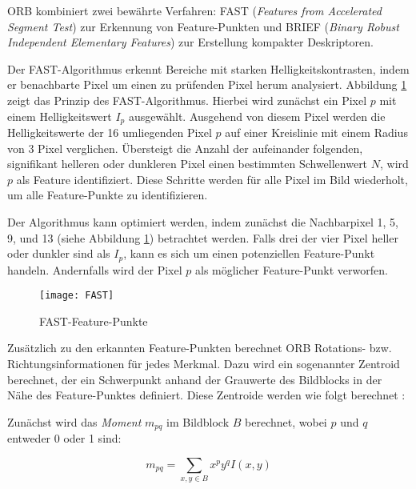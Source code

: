 ORB kombiniert zwei bewährte Verfahren: FAST (\emph{Features from Accelerated Segment Test}) zur Erkennung von Feature-Punkten und BRIEF (\emph{Binary Robust Independent Elementary Features}) zur Erstellung kompakter Deskriptoren. \cite{gao2021vSLAM, rublee2011orb}

Der FAST-Algorithmus erkennt Bereiche mit starken Helligkeitskontrasten, indem er benachbarte Pixel um einen zu prüfenden Pixel herum analysiert. Abbildung \ref{fig:FAST} zeigt das Prinzip des FAST-Algorithmus. Hierbei wird zunächst ein Pixel \( p \) mit einem Helligkeitswert \( I_p \) ausgewählt. Ausgehend von diesem Pixel werden die Helligkeitswerte der 16 umliegenden Pixel \( p \) auf einer Kreislinie mit einem Radius von 3 Pixel verglichen. Übersteigt die Anzahl der aufeinander folgenden, signifikant helleren oder dunkleren Pixel einen bestimmten Schwellenwert \( N \), wird \( p \) als Feature identifiziert. Diese Schritte werden für alle Pixel im Bild wiederholt, um alle Feature-Punkte zu identifizieren. \cite{gao2021vSLAM, rublee2011orb, rosten2006fast}

Der Algorithmus kann optimiert werden, indem zunächst die Nachbarpixel 1, 5, 9, und 13 (siehe Abbildung \ref{fig:FAST}) betrachtet werden. Falls drei der vier Pixel heller oder dunkler sind als \( I_p \), kann es sich um einen potenziellen Feature-Punkt handeln. Andernfalls wird der Pixel \( p \) als möglicher Feature-Punkt verworfen. \cite{gao2021vSLAM, rublee2011orb, rosten2006fast}

\begin{figure}[ht]
    \centering
    \texttt{[image: FAST]}
    \caption{FAST-Feature-Punkte \cite{rosten2006fast}\label{fig:FAST}}\par
\end{figure}

Zusätzlich zu den erkannten Feature-Punkten berechnet ORB Rotations- bzw. Richtungsinformationen für jedes Merkmal. Dazu wird ein sogenannter Zentroid berechnet, der ein Schwerpunkt anhand der Grauwerte des Bildblocks in der Nähe des Feature-Punktes definiert. Diese Zentroide werden wie folgt berechnet \cite{gao2021vSLAM, rublee2011orb}:

Zunächst wird das \emph{Moment} \( m_{pq} \) im Bildblock \( B \) berechnet, wobei \( p \) und \( q \) entweder 0 oder 1 sind:

\begin{equation}
    m_{pq} = \sum_{x,y \in B} x^p y^q I(x, y)
\end{equation}


